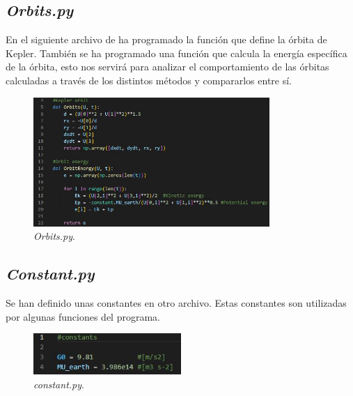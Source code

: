 \documentclass[12pt,a4paper]{article}
\begin{document}
\subsection{\textit{Orbits.py}}
En el siguiente archivo de ha programado la función que define la órbita de Kepler. También se ha programado una función que calcula la energía específica de la órbita, esto nos servirá para analizar el comportamiento de las órbitas calculadas a través de los distintos métodos y compararlos entre sí.
\begin{figure}[H] 
	\centering
	\includegraphics[width=0.8\textwidth]{FIGURES/Codigo/orbits.jpg}
	\caption{\textit{Orbits.py}.}
\end{figure}

\subsection{\textit{Constant.py}}
Se han definido unas constantes en otro archivo. Estas constantes son utilizadas por algunas funciones del programa. 
\begin{figure}[H] 
	\centering
	\includegraphics[width=0.5\textwidth]{FIGURES/Codigo/constants.jpg}
	\caption{\textit{constant.py}.}
\end{figure}
\end{document}

